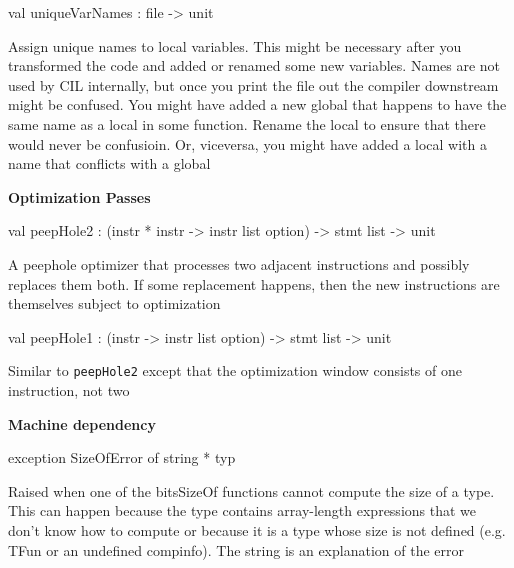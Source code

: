 \documentclass[11pt]{article}
\begin{document}
\label{val:Cil.uniqueVarNames}\begin{ocamldoccode}
val uniqueVarNames : file -> unit
\end{ocamldoccode}
\begin{ocamldocdescription}
Assign unique names to local variables. This might be necessary after you 
 transformed the code and added or renamed some new variables. Names are 
 not used by CIL internally, but once you print the file out the compiler 
 downstream might be confused. You might 
 have added a new global that happens to have the same name as a local in 
 some function. Rename the local to ensure that there would never be 
 confusioin. Or, viceversa, you might have added a local with a name that 
 conflicts with a global


\end{ocamldocdescription}




{\bf Optimization Passes}



\label{val:Cil.peepHole2}\begin{ocamldoccode}
val peepHole2 : (instr * instr -> instr list option) -> stmt list -> unit
\end{ocamldoccode}
\begin{ocamldocdescription}
A peephole optimizer that processes two adjacent instructions and possibly 
    replaces them both. If some replacement happens, then the new instructions
    are themselves subject to optimization


\end{ocamldocdescription}




\label{val:Cil.peepHole1}\begin{ocamldoccode}
val peepHole1 : (instr -> instr list option) -> stmt list -> unit
\end{ocamldoccode}
\begin{ocamldocdescription}
Similar to {\tt{peepHole2}} except that the optimization window consists of 
    one instruction, not two


\end{ocamldocdescription}




{\bf Machine dependency}



\label{exception:Cil.SizeOfError}\begin{ocamldoccode}
exception SizeOfError of string * typ
\end{ocamldoccode}
\begin{ocamldocdescription}
Raised when one of the bitsSizeOf functions cannot compute the size of a 
 type. This can happen because the type contains array-length expressions 
 that we don't know how to compute or because it is a type whose size is 
 not defined (e.g. TFun or an undefined compinfo). The string is an 
 explanation of the error


\end{ocamldocdescription}
\end{document}

